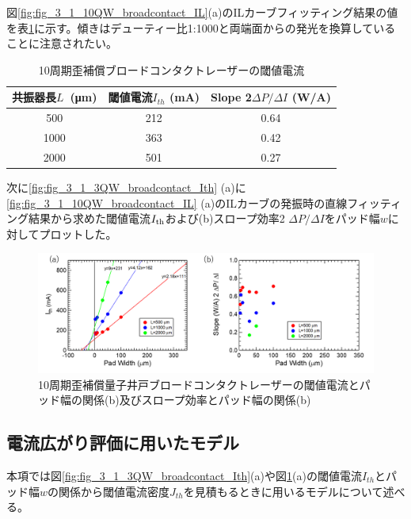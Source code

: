 図\ref{fig:fig_3_1_10QW_broadcontact_IL}(a)のILカーブフィッティング結果の値を表\ref{table:table_3_1_10QW_broadcontact}に示す。傾きはデューティー比1:1000と両端面からの発光を換算していることに注意されたい。
\begin{table}[h]
  \caption{10周期歪補償ブロードコンタクトレーザーの閾値電流}
  \label{table:table_3_1_10QW_broadcontact}
  \centering
  \begin{tabular}{ccc}
    \hline
    共振器長$L$\ (\si{\micro\metre})  & 閾値電流$I_{th}$ (mA)  & Slope 2$\Delta P/\Delta I$ (W/A) \\
    \hline \hline
     500& 212&  0.64  \\
    1000& 363& 0.42\\
    2000& 501&0.27\\
       \hline
  \end{tabular}
\end{table}

次に\ref{fig:fig_3_1_3QW_broadcontact_Ith} (a)に\ref{fig:fig_3_1_10QW_broadcontact_IL} (a)のILカーブの発振時の直線フィッティング結果から求めた閾値電流$I_{\rm{th}}$および(b)スロープ効率2 $\Delta P/\Delta I$をパッド幅$w$に対してプロットした。
\begin{figure}[h]
	\centering
	\includegraphics[width=15cm]{figure/fig_3_1_10QW_broadcontact_Ith.png}
		\caption{10周期歪補償量子井戸ブロードコンタクトレーザーの閾値電流とパッド幅の関係(b)及びスロープ効率とパッド幅の関係(b)}
		\label{fig:fig_3_1_10QW_broadcontact_Ith}
\end{figure}
\subsection{電流広がり評価に用いたモデル}%
本項では図\ref{fig:fig_3_1_3QW_broadcontact_Ith}(a)や図\ref{fig:fig_3_1_10QW_broadcontact_Ith}(a)の閾値電流$I_{th}$とパッド幅$w$の関係から閾値電流密度$J_{th}$を見積もるときに用いるモデルについて述べる。

